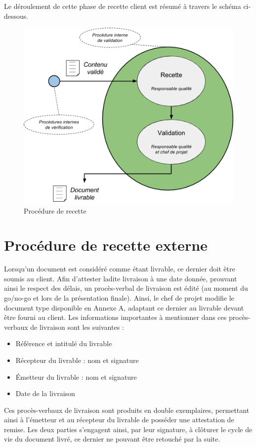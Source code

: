 Le déroulement de cette phase de recette client est résumé à travers le schéma ci-dessous.

\begin{figure}[H]
    \centering
    \label{fig-recette}
    \includegraphics[scale=0.5]{figures/recette_part.png}
    \caption{Procédure de recette}
\end{figure}

\section{Procédure de recette externe}

Lorsqu’un document est considéré comme étant livrable, ce dernier doit être soumis au client. Afin d’attester ladite livraison à une date donnée, prouvant ainsi le respect des délais, un procès-verbal de livraison est édité (au moment du go/no-go et lors de la présentation finale). Ainsi, le chef de projet modifie le document type disponible en Annexe A, adaptant ce dernier au livrable devant être fourni au client. Les informations importantes à mentionner dans ces procès-verbaux de livraison sont les suivantes : \\

\begin{itemize}
    \item[\textbullet] Référence et intitulé du livrable
    \item[\textbullet] Récepteur du livrable : nom et signature
    \item[\textbullet] Émetteur du livrable : nom et signature
    \item[\textbullet] Date de la livraison \\
\end{itemize}

Ces procès-verbaux de livraison sont produits en double exemplaires, permettant ainsi à l’émetteur et au récepteur du livrable de posséder une attestation de remise. Les deux parties s’engagent ainsi, par leur signature, à clôturer le cycle de vie du document livré, ce dernier ne pouvant être retouché par la suite.
